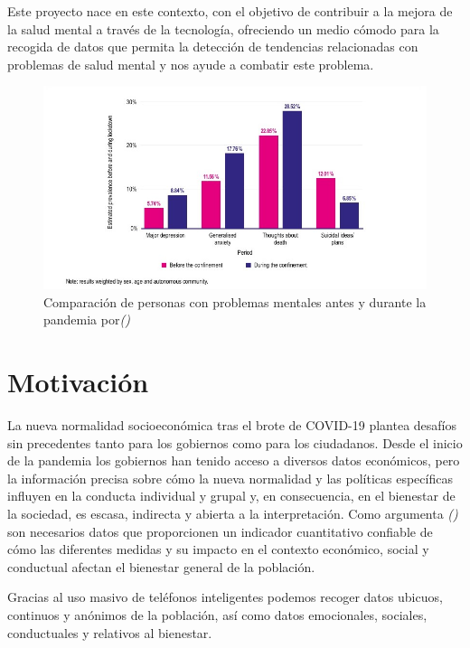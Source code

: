 Este proyecto nace en este contexto, con el objetivo de contribuir a la mejora de la salud mental a través de la tecnología, ofreciendo un medio cómodo para la recogida de datos que permita la detección de tendencias relacionadas con problemas de salud mental y nos ayude a combatir este problema.

\begin{figure}[!ht]
    \centering
    \includegraphics[width=1\textwidth]{imagenes/graficaCovid.jpg}
    \caption{ Comparación de personas con problemas mentales antes y durante la pandemia por\textit{(\cite{impactocovid})}}
    \label{fig:impacto}
\end{figure}


\section{Motivación}

La nueva normalidad socioeconómica tras el brote de COVID-19 plantea desafíos sin precedentes tanto para los gobiernos como para los ciudadanos. Desde el inicio de la pandemia los gobiernos han tenido acceso a diversos datos económicos, pero la información precisa sobre cómo la nueva normalidad y las políticas específicas influyen en la conducta individual y grupal y, en consecuencia, en el bienestar de la sociedad, es escasa, indirecta y abierta a la interpretación. Como argumenta \textit{(\cite{medicion2009})} son necesarios datos que proporcionen un indicador cuantitativo confiable de cómo las diferentes medidas y su impacto en el contexto económico, social y conductual afectan el bienestar general de la población.\vspace{0.3cm}

Gracias al uso masivo de teléfonos inteligentes podemos recoger datos ubicuos, continuos y anónimos de la población, así como datos emocionales, sociales, conductuales y relativos al bienestar.\vspace{0.3cm}

